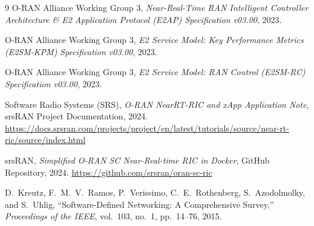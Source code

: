 \documentclass[11pt,a4paper]{article}
\begin{document}
\begin{thebibliography}{9}
O-RAN Alliance Working Group 3, \emph{Near-Real-Time RAN Intelligent Controller Architecture \& E2 Application Protocol (E2AP) Specification v03.00}, 2023.

O-RAN Alliance Working Group 3, \emph{E2 Service Model: Key Performance Metrics (E2SM-KPM) Specification v03.00}, 2023.

O-RAN Alliance Working Group 3, \emph{E2 Service Model: RAN Control (E2SM-RC) Specification v03.00}, 2023.

Software Radio Systems (SRS), \emph{O-RAN NearRT-RIC and xApp Application Note}, srsRAN Project Documentation, 2024. \url{https://docs.srsran.com/projects/project/en/latest/tutorials/source/near-rt-ric/source/index.html}

srsRAN, \emph{Simplified O-RAN SC Near-Real-time RIC in Docker}, GitHub Repository, 2024. \url{https://github.com/srsran/oran-sc-ric}

D.~Kreutz, F.~M.~V.~Ramos, P.~Verissimo, C.~E.~Rothenberg, S.~Azodolmolky, and S.~Uhlig, ``Software-Defined Networking: A Comprehensive Survey,'' \emph{Proceedings of the IEEE}, vol.~103, no.~1, pp.~14--76, 2015.
\end{thebibliography}
\end{document}

